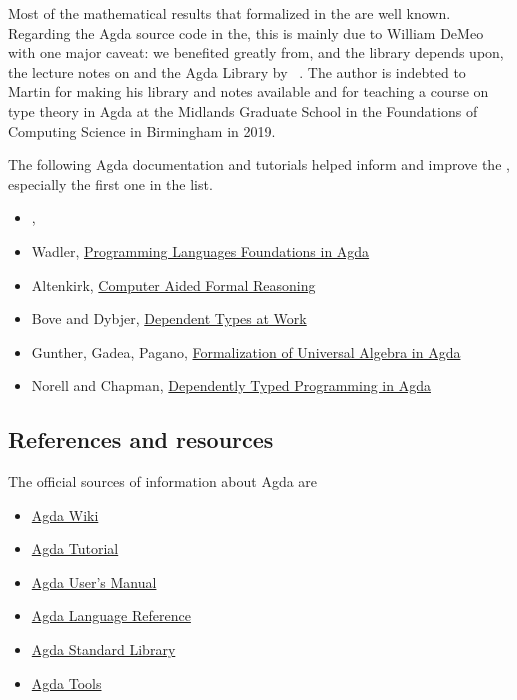 Most of the mathematical results that formalized in the \ualib are well known. Regarding the Agda source code in the\agdaualib, this is mainly due to William DeMeo with one major caveat: we benefited greatly from, and the library depends upon, the lecture notes on \ufcourse and the \typetopology Agda Library by \escardo~\cite{MHE}. The author is indebted to Martin for making his library and notes available and for teaching a course on type theory in Agda at the Midlands Graduate School in the Foundations of Computing Science in Birmingham in 2019.

The following Agda documentation and tutorials helped inform and improve the \ualib, especially the first one in the list.

\begin{itemize}
\item \escardo, \ufcourse
\item Wadler, \href{https://plfa.github.io/}{Programming Languages Foundations in Agda}
\item Altenkirk, \href{http://www.cs.nott.ac.uk/~psztxa/g53cfr/}{Computer Aided Formal Reasoning}
\item Bove and Dybjer, \href{http://www.cse.chalmers.se/~peterd/papers/DependentTypesAtWork.pdf}{Dependent Types at Work}
\item Gunther, Gadea, Pagano, \href{http://www.sciencedirect.com/science/article/pii/S1571066118300768}{Formalization of Universal Algebra in Agda}
\item Norell and Chapman, \href{http://www.cse.chalmers.se/~ulfn/papers/afp08/tutorial.pdf}{Dependently Typed Programming in Agda}
\end{itemize}


\subsection*{References and resources}

The official sources of information about Agda are
\begin{itemize}
\item \href{https://wiki.portal.chalmers.se/agda/pmwiki.php}{Agda Wiki}
\item \href{https://people.inf.elte.hu/pgj/agda/tutorial/Index.html}{Agda Tutorial}
\item \href{https://agda.readthedocs.io/en/v2.6.1/}{Agda User's Manual}
\item \href{https://agda.readthedocs.io/en/v2.6.1/language}{Agda Language Reference}
\item \href{https://agda.github.io/agda-stdlib/}{Agda Standard Library}
\item \href{https://agda.readthedocs.io/en/v2.6.1/tools/}{Agda Tools}
\end{itemize}


